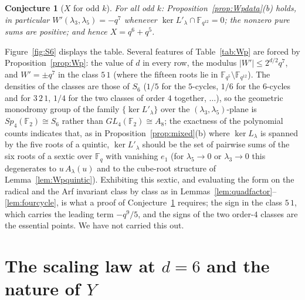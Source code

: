 \documentclass[11pt,a4paper]{amsart}
\newtheorem{conjecture}[theorem]{Conjecture}
\theoremstyle{definition}
\newcommand{\F}{\mathbb{F}}
\begin{document}
\begin{conjecture}[$X$ for odd $k$]\label{conj:Wp}
For all odd $k$: Proposition~\ref{prop:Wpdata}(b) holds, in particular $W'(\lambda_3,\lambda_5)=-q^7$ whenever $\ker L'_\lambda\cap\F_{q^{12}}=0$; the nonzero pure sums are positive; and hence $X=q^6+q^5$.
\end{conjecture}

\begin{sloppypar}
Figure~\ref{fig:S6} displays the table. Several features of Table~\ref{tab:Wp} are forced by Proposition~\ref{prop:Wp}: the value of $d$ in every row, the modulus $|W'|\le 2^{d/2}q^7$, and $W'=\pm q^7$ in the class $5\,1$ (where the fifteen roots lie in $\F_{q^5}\setminus\F_{q^{12}}$). The densities of the classes are those of $S_6$ ($1/5$ for the $5$-cycles, $1/6$ for the $6$-cycles and for $3\,2\,1$, $1/4$ for the two classes of order $4$ together, $\ldots$), so the geometric monodromy group of the family $\{\ker L'_\lambda\}$ over the $(\lambda_3,\lambda_5)$-plane is $Sp_4(\F_2)\cong S_6$ rather than $GL_4(\F_2)\cong A_8$; the exactness of the polynomial counts indicates that, as in Proposition~\ref{prop:mixed}(b) where $\ker L_\lambda$ is spanned by the five roots of a quintic, $\ker L'_\lambda$ should be the set of pairwise sums of the six roots of a sextic over $\F_q$ with vanishing $e_1$ (for $\lambda_5\to0$ or $\lambda_3\to0$ this degenerates to $u\,A_\lambda(u)$ and to the cube-root structure of Lemma~\ref{lem:Wpquintic}). Exhibiting this sextic, and evaluating the form on the radical and the Arf invariant class by class as in Lemmas~\ref{lem:quadfactor}--\ref{lem:fourcycle}, is what a proof of Conjecture~\ref{conj:Wp} requires; the sign in the class $5\,1$, which carries the leading term $-q^9/5$, and the signs of the two order-$4$ classes are the essential points. We have not carried this out.
\end{sloppypar}

\section{The scaling law at \texorpdfstring{$d=6$}{d=6} and the nature of \texorpdfstring{$Y$}{Y}}\label{sec:Y}
\end{document}
